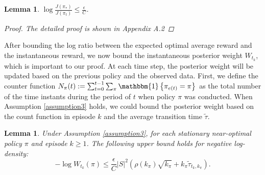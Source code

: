 \documentclass{article}
\theoremstyle{plain}
\newtheorem{lemma}[theorem]{Lemma}
\theoremstyle{definition}
\theoremstyle{remark}
\begin{document}
\begin{lemma} 
$\log \frac{J(\pi_{*})}{J(\pi_{t})} \leq \frac{\epsilon}{C}$. 
\begin{proof}
The detailed proof is shown in Appendix A.2
\end{proof}
\end{lemma}


After bounding the log ratio between the expected optimal average reward and the instantaneous reward, we now bound the instantaneous posterior weight $W_{t_{k}}$, which is important to our proof. At each time step, the posterior weight will be updated based on the previous policy and the observed data. First, we define the counter function $N_{\pi}(t):=\sum_{t=0}^{t-1} \sum_{\pi} \mathbbm{1}\left\{\pi_{e(t)}=\pi\right\}$ as the total number of the time instants during the period of $t$ when policy $\pi$ was conducted. When Assumption \ref{assumption3} holds, we could bound the posterior weight based on the count function in episode $k$ and the average transition time $\tilde \tau$.

\begin{lemma}
\label{lemma3}
Under Assumption \ref{assumption3}, for each stationary near-optimal policy $\pi$ and episode $k \geq 1$. The following upper bound holds for negative log-density:
\[
-\log W_{t_{k}}(\pi) \leq \frac{\epsilon}{C}|S|^{2}(  \rho(k_{\pi}) \sqrt{k_{\pi}} + k_{\pi} \tilde{\tau}_{t_{k},k_{\pi}}).
\]
\end{lemma}
\end{document}
